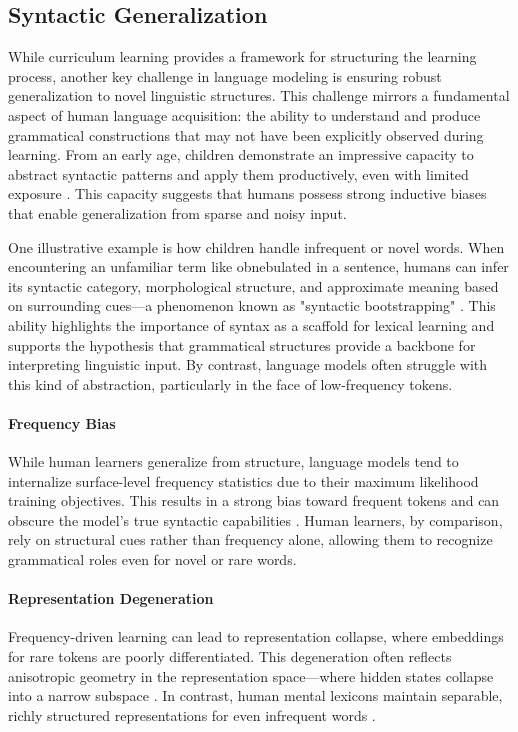 \subsection{Syntactic Generalization}

While curriculum learning provides a framework for structuring the learning process, another key challenge in language modeling is ensuring robust generalization to novel linguistic structures. This challenge mirrors a fundamental aspect of human language acquisition: the ability to understand and produce grammatical constructions that may not have been explicitly observed during learning. From an early age, children demonstrate an impressive capacity to abstract syntactic patterns and apply them productively, even with limited exposure \citep{yang2013poverty, legate2002empirical}. This capacity suggests that humans possess strong inductive biases that enable generalization from sparse and noisy input.

One illustrative example is how children handle infrequent or novel words. When encountering an unfamiliar term like obnebulated in a sentence, humans can infer its syntactic category, morphological structure, and approximate meaning based on surrounding cues—a phenomenon known as "syntactic bootstrapping" \citep{gleitman1990structural, naigles1990children}. This ability highlights the importance of syntax as a scaffold for lexical learning and supports the hypothesis that grammatical structures provide a backbone for interpreting linguistic input. By contrast, language models often struggle with this kind of abstraction, particularly in the face of low-frequency tokens.

\paragraph{Frequency Bias} While human learners generalize from structure, language models tend to internalize surface-level frequency statistics due to their maximum likelihood training objectives. This results in a strong bias toward frequent tokens and can obscure the model's true syntactic capabilities \citep{feldman2020does, haviv2023understanding}. Human learners, by comparison, rely on structural cues rather than frequency alone, allowing them to recognize grammatical roles even for novel or rare words.

\paragraph{Representation Degeneration} Frequency-driven learning can lead to representation collapse, where embeddings for rare tokens are poorly differentiated. This degeneration often reflects anisotropic geometry in the representation space—where hidden states collapse into a narrow subspace \citep{ethayarajh2019contextual}. In contrast, human mental lexicons maintain separable, richly structured representations for even infrequent words \citep{murphy2002bigbook}.

